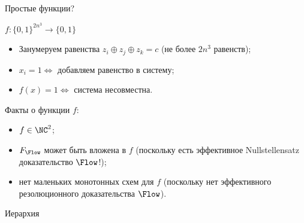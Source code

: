 \begin{frame}{Простые функции?}

    $f\colon \{0, 1\}^{2 n^3} \to \{0, 1\}$

    \begin{itemize}
        \item Занумеруем равенства $z_i \oplus z_j \oplus z_k = c$ (не более $2 n^3$ равенств);
        \item $x_i = 1 \Leftrightarrow$ добавляем равенство в систему;
        \item $f(x) = 1 \Leftrightarrow$ система несовместна.
    \end{itemize}

    \pause
    Факты о функции $f$:
    \begin{itemize}
        \item $f \in \NC^2$;
        \item $F_{\Flow}$ может быть вложена в $f$ (поскольку есть эффективное Nullstellensatz
            доказательство $\Flow$!);
        \item нет маленьких монотонных схем для $f$ (поскольку нет эффективного резолюционного
            доказательства $\Flow$).
    \end{itemize}
\end{frame}


\begin{frame}{Иерархия}

    
    
\end{frame}

